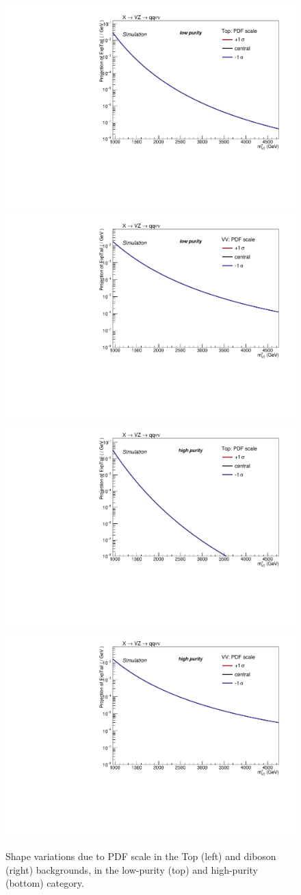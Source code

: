  \begin{figure}[!htb]
   \begin{center}
     \includegraphics[width=.495\textwidth]{plotsAlpha_tesi/XVZnnlp/SysTop_Scale.pdf}
     \includegraphics[width=.495\textwidth]{plotsAlpha_tesi/XVZnnlp/SysVV_Scale.pdf}
     \\
     \includegraphics[width=.495\textwidth]{plotsAlpha_tesi/XVZnnhp/SysTop_Scale.pdf}
     \includegraphics[width=.495\textwidth]{plotsAlpha_tesi/XVZnnhp/SysVV_Scale.pdf}

   \end{center}
   \caption{Shape variations due to PDF scale in the Top (left) and diboson (right) backgrounds, in the low-purity (top) and high-purity (bottom) category.}
   \label{fig:sysPDF}
 \end{figure}


